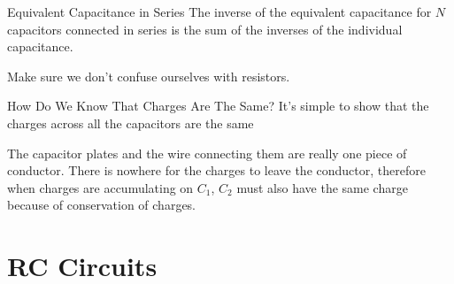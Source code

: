 \documentclass[12pt,aspectratio=169]{beamer}
\begin{document}
\begin{frame}{Equivalent Capacitance in Series}
  The inverse of the equivalent capacitance for $N$ capacitors connected in
  series is the sum of the inverses of the individual capacitance.

  
  Make sure we don't confuse ourselves with resistors.
\end{frame}



\begin{frame}{How Do We Know That Charges Are The Same?}
  It's simple to show that the charges across all the capacitors are the same
  \begin{center}
  \end{center}
  The capacitor plates and the wire connecting them are really one piece of
  conductor. There is nowhere for the charges to leave the conductor, therefore
  when charges are accumulating on $C_1$, $C_2$ must also have the same charge
  because of conservation of charges.
\end{frame}



\section{RC Circuits}

\end{document}
